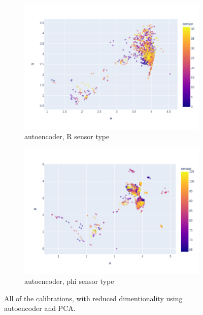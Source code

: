 \begin{figure}
\begin{subfigure}[b]{0.45\textwidth}
    \centering
    \includegraphics[width=\linewidth]{figures/chapter4/dimred/NN_module_R_all.png}
\caption{autoencoder, R sensor type}
   \label{plot:nn_all_r}
  \end{subfigure}
\begin{subfigure}[b]{0.45\textwidth}
    \centering
    \includegraphics[width=\linewidth]{figures/chapter4/dimred/NN_module_phi_all.png}
\caption{autoencoder, phi sensor type}
   \label{plot:nn_all_phi}
  \end{subfigure}

    \caption[All calibrationd]{All of the calibrations, with reduced dimentionality using autoencoder and PCA.}
\end{figure}
